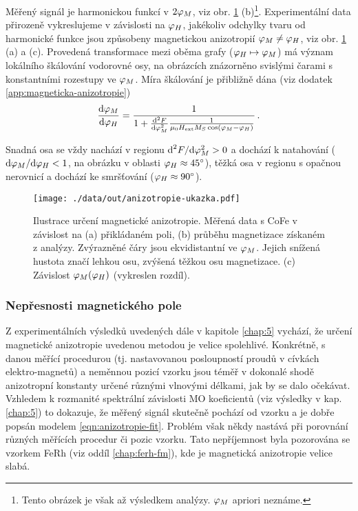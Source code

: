 Měřený signál je harmonickou funkcí v $2\varphi_M$, viz obr. \ref{fig:anizotropie-vizualni} (b)\footnote{Tento obrázek je však až výsledkem analýzy. $\varphi_M$ apriori neznáme.}.
Experimentální data přirozeně vykreslujeme v závislosti na $\varphi_H$, jakékoliv odchylky tvaru od harmonické funkce jsou způsobeny magnetickou anizotropií $\varphi_M\neq\varphi_H$, viz obr. \ref{fig:anizotropie-vizualni} (a) a (c).
Provedená transformace mezi oběma grafy ($\varphi_H \mapsto \varphi_M$) má význam lokálního škálování vodorovné osy, na obrázcích znázorněno svislými čarami s konstantními rozestupy ve $\varphi_M$.
Míra škálování je přibližně dána (viz dodatek \ref{app:magneticka-anizotropie})
\begin{equation}
    \frac{\textrm{d}\varphi_M}{\textrm{d}\varphi_H} = \frac{1}{1+\frac{\textrm{d}^2 F}{\textrm{d}\varphi_M^2}\frac{1}{\mu_0 H_\textrm{ext} M_S \cos(\varphi_M-\varphi_H)}} \,.
\end{equation}

Snadná osa se vždy nachází v regionu $\textrm{d}^2F/\textrm{d}\varphi_M^2 > 0$ a dochází k natahování ($\textrm{d}\varphi_M/\textrm{d}\varphi_H < 1$, na obrázku v oblasti $\varphi_H\approx\SI{45}{\degree}$), těžká osa v regionu s opačnou nerovnicí a dochází ke smršťování ($\varphi_H\approx\SI{90}{\degree}$).

\begin{figure}[htbp]
    \centering
    \texttt{[image: ./data/out/anizotropie-ukazka.pdf]}
    \caption{Ilustrace určení magnetické anizotropie. Měřená data s CoFe v závislost na (a) přikládaném poli, (b) průběhu magnetizace získaném z analýzy.
    Zvýrazněné čáry jsou ekvidistantní ve $\varphi_M$. Jejich snížená hustota značí lehkou osu, zvýšená těžkou osu magnetizace. (c) Závislost $\varphi_M(\varphi_H)$ (vykreslen rozdíl).}
    \label{fig:anizotropie-vizualni}
\end{figure}


\subsubsection{Nepřesnosti magnetického pole}

Z experimentálních výsledků uvedených dále v kapitole \ref{chap:5} vychází, že určení magnetické anizotropie uvedenou metodou je velice spolehlivé.
Konkrétně, s danou měřící procedurou (tj. nastavovanou posloupností proudů v cívkách elektro-magnetů) a neměnnou pozicí vzorku jsou téměř v dokonalé shodě anizotropní konstanty určené různými vlnovými délkami, jak by se dalo očekávat.
Vzhledem k rozmanité spektrální závislosti MO koeficientů (viz výsledky v kap. \ref{chap:5}) to dokazuje, že měřený signál skutečně pochází od vzorku a je dobře popsán modelem \eqref{eqn:anizotropie-fit}.
Problém však někdy nastává při porovnání různých měřících procedur či pozic vzorku.
Tato nepříjemnost byla pozorována se vzorkem FeRh (viz oddíl \ref{chap:ferh-fm}), kde je magnetická anizotropie velice slabá.

